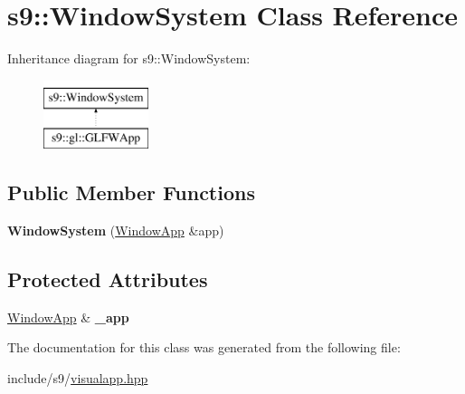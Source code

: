 \hypertarget{classs9_1_1WindowSystem}{\section{s9\-:\-:\-Window\-System \-Class \-Reference}
\label{classs9_1_1WindowSystem}
}
\-Inheritance diagram for s9\-:\-:\-Window\-System\-:\begin{figure}[H]
\begin{center}
\leavevmode
\includegraphics[height=2.000000cm]{classs9_1_1WindowSystem}
\end{center}
\end{figure}
\subsection*{\-Public \-Member \-Functions}
\begin{DoxyCompactItemize}
\item 
\hypertarget{classs9_1_1WindowSystem_a0b0cdd9409f154bbafc02f28d4e13805}{{\bfseries \-Window\-System} (\hyperlink{classs9_1_1WindowApp}{\-Window\-App} \&app)}\label{classs9_1_1WindowSystem_a0b0cdd9409f154bbafc02f28d4e13805}

\end{DoxyCompactItemize}
\subsection*{\-Protected \-Attributes}
\begin{DoxyCompactItemize}
\item 
\hypertarget{classs9_1_1WindowSystem_afb0943288d3d6fb6f53e580fc7bb6918}{\hyperlink{classs9_1_1WindowApp}{\-Window\-App} \& {\bfseries \-\_\-app}}\label{classs9_1_1WindowSystem_afb0943288d3d6fb6f53e580fc7bb6918}

\end{DoxyCompactItemize}


\-The documentation for this class was generated from the following file\-:\begin{DoxyCompactItemize}
\item 
include/s9/\hyperlink{visualapp_8hpp}{visualapp.\-hpp}\end{DoxyCompactItemize}

